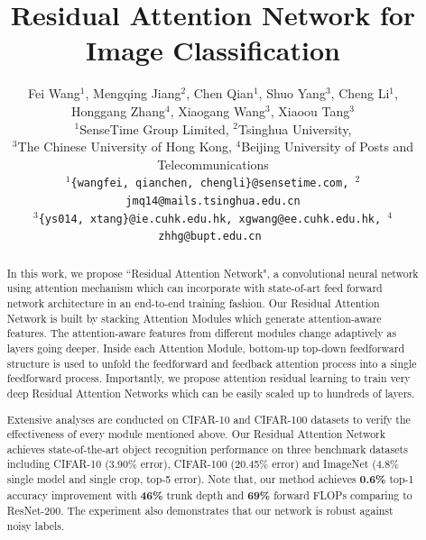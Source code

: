 \documentclass[10pt,twocolumn,letterpaper]{article}
\begin{document}
\title{Residual Attention Network for Image Classification}

\author{Fei Wang$^1$, Mengqing Jiang$^2$, Chen Qian$^1$, Shuo Yang$^3$, Cheng Li$^1$, \\
Honggang Zhang$^4$, Xiaogang Wang$^3$, Xiaoou Tang$^3$ \\
$^1$SenseTime Group Limited, $^2$Tsinghua University,\\
 $^3$The Chinese University of Hong Kong, $^4$Beijing University of Posts and Telecommunications \\
\tt\small$^1$\{wangfei, qianchen, chengli\}@sensetime.com, $^2$jmq14@mails.tsinghua.edu.cn\\
\tt\small$^3$\{ys014, xtang\}@ie.cuhk.edu.hk, xgwang@ee.cuhk.edu.hk, $^4$zhhg@bupt.edu.cn
}


\maketitle
\thispagestyle{empty}

\begin{abstract}
In this work, we propose ``Residual Attention Network", a convolutional neural network using attention mechanism which can incorporate with state-of-art feed forward network architecture in an end-to-end training fashion.
%
Our Residual Attention Network is built by stacking Attention Modules which generate attention-aware features. The attention-aware features from different modules change adaptively as layers going deeper. Inside each Attention Module, bottom-up top-down feedforward structure is used to unfold the feedforward and feedback attention process into a single feedforward process. Importantly, we propose attention residual learning to train very deep Residual Attention Networks which can be easily scaled up to hundreds of layers.

Extensive analyses are conducted on CIFAR-10 and CIFAR-100 datasets to verify the effectiveness of every module mentioned above. Our Residual Attention Network achieves state-of-the-art object recognition performance on three benchmark datasets including CIFAR-10 (3.90\% error), CIFAR-100 (20.45\% error) and ImageNet (4.8\% single model and single crop, top-5 error). Note that, our method achieves \textbf{0.6\%} top-1 accuracy improvement with \textbf{46\%} trunk depth and \textbf{69\%} forward FLOPs comparing to ResNet-200. The experiment also demonstrates that our network is robust against noisy labels.
\end{abstract}
\end{document}
